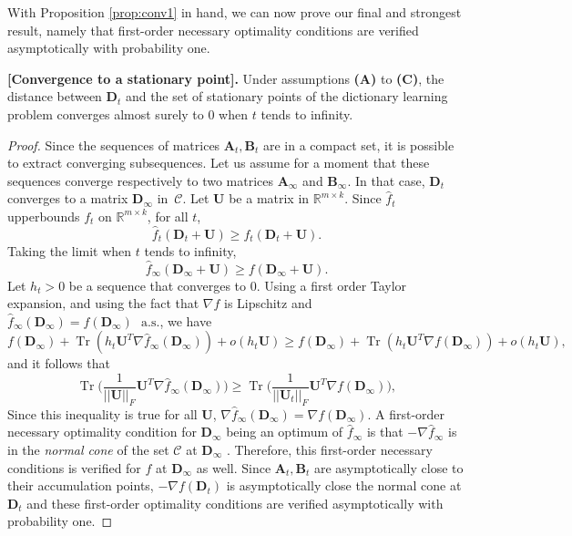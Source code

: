 \documentclass[twoside,11pt]{article}
\def\hatf{{ \hat f}}
\def\as{\text{~~a.s.}}
\def\D{{\mathbf D}}
\def\B{{\mathbf B}}
\def\C{{\mathcal C}}
\def\hatf{{ \hat f}}
\def\Real{{\mathbb R}}
\def\U{{\mathbf U}}
\def\A{{\mathbf A}}
\def\trace{\operatorname{Tr}}
\begin{document}
With Proposition \ref{prop:conv1} in hand, we can now prove our final and
strongest result, namely that first-order necessary optimality conditions are
verified asymptotically with probability one. 
\begin{proposition}{\bf [Convergence to a stationary point].}
   \label{prop:conv2} 
   Under assumptions {\bf (A)} to {\bf (C)}, the distance between $\D_t$ and
   the set of stationary points of the dictionary learning problem converges
   almost surely to $0$ when $t$ tends to infinity.
\end{proposition}
\begin{proof}
   Since the sequences of matrices $\A_t,\B_t$ are in a compact set, it is
   possible to extract converging subsequences. Let us assume for a moment
   that these sequences converge respectively to two matrices $\A_\infty$ and
   $\B_\infty$. In that case, $\D_t$ converges to a matrix $\D_\infty$ in~$\C$. 
   Let $\U$ be a matrix in $\Real^{m \times k}$. Since
   $\hatf_t$ upperbounds $f_t$ on $\Real^{m \times k}$, for all $t$,
   \begin{displaymath}
      \hatf_t(\D_t+\U) \geq f_t(\D_t+\U).
   \end{displaymath}
   Taking the limit when $t$ tends to infinity, 
   \begin{displaymath}
      \hatf_\infty(\D_\infty+\U) \geq f(\D_\infty+\U).
   \end{displaymath}
   Let $h_t > 0$ be a sequence that converges to $0$.
   Using a first order Taylor expansion, and using the fact that $\nabla f$ is
   Lipschitz and $\hatf_\infty(\D_\infty) = f(\D_\infty) \as$, we have
   \begin{displaymath}
      f(\D_\infty)+\trace(h_t\U^T\nabla \hatf_\infty(\D_\infty)) + o(h_t\U) \geq f(\D_\infty)+\trace(h_t\U^T\nabla f(\D_\infty)) + o(h_t\U),
   \end{displaymath}
   and it follows that
   \begin{displaymath}
      \trace\Big(\frac{1}{||\U||_F}\U^T\nabla \hatf_\infty(\D_\infty)\Big) \geq \trace\Big(\frac{1}{||\U_t||_F}\U^T\nabla f(\D_\infty)\Big),
   \end{displaymath}
   Since this inequality is true for all $\U$, $\nabla\hatf_\infty(\D_\infty)=\nabla f(\D_\infty)$. 
   A first-order necessary optimality condition for $\D_\infty$ being an optimum of $\hatf_\infty$ is that
   $-\nabla \hatf_\infty$ is in the {\em normal cone} of the set $\C$ at $\D_\infty$ \citep{borwein}.
   Therefore, this first-order necessary conditions is verified for $f$ at $\D_\infty$ as well.
   Since $\A_t,\B_t$ are  asymptotically close to their accumulation points, $-\nabla f(\D_t)$ is asymptotically close
   the normal cone at $\D_t$ and these first-order optimality conditions are verified asymptotically with probability one.
\end{proof}
\end{document}
